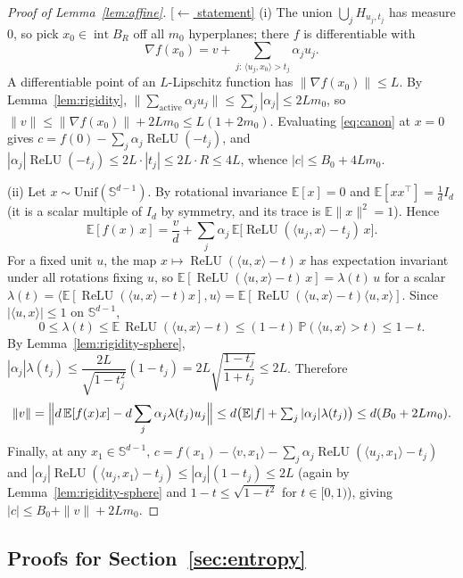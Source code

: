 \documentclass[11pt,reqno]{amsart}
\theoremstyle{plain}
\theoremstyle{definition}
\theoremstyle{remark}
\newcommand{\Sd}{\mathbb{S}^{d-1}}
\newcommand{\PP}{\mathbb{P}}
\newcommand{\EE}{\mathbb{E}}
\newcommand{\relu}{\operatorname{ReLU}}
\newcommand{\inn}[2]{\langle #1,#2\rangle}
\newcommand{\stmtbutton}[1]{\hyperref[#1]{\textnormal{\footnotesize\textsf{[$\leftarrow$ statement]}}}}
\begin{document}
\begin{proof}[Proof of Lemma~\textup{\ref{lem:affine}}]\label{proof:affine}\stmtbutton{lem:affine}
(i) The union $\bigcup_j H_{u_j,t_j}$ has measure $0$, so pick $x_0\in\operatorname{int}B_R$ off all $m_0$ hyperplanes; there $f$ is differentiable with
\[
\nabla f(x_0)=v+\sum_{j:\,\inn{u_j}{x_0}>t_j}\alpha_ju_j.
\]
A differentiable point of an $L$-Lipschitz function has $\|\nabla f(x_0)\|\le L$. By Lemma~\ref{lem:rigidity}, $\|\sum_{\text{active}}\alpha_ju_j\|\le\sum_j|\alpha_j|\le2Lm_0$, so $\|v\|\le\|\nabla f(x_0)\|+2Lm_0\le L(1+2m_0)$. Evaluating \eqref{eq:canon} at $x=0$ gives $c=f(0)-\sum_j\alpha_j\relu(-t_j)$, and $|\alpha_j|\relu(-t_j)\le2L\cdot|t_j|\le2L\cdot R\le4L$, whence $|c|\le B_0+4Lm_0$.

(ii) Let $x\sim\mathrm{Unif}(\Sd)$. By rotational invariance $\EE[x]=0$ and $\EE[xx^\top]=\tfrac1d I_d$ (it is a scalar multiple of $I_d$ by symmetry, and its trace is $\EE\|x\|^2=1$). Hence
\[
\EE[f(x)\,x]=\frac vd+\sum_j\alpha_j\,\EE\!\bigl[\relu(\inn{u_j}{x}-t_j)\,x\bigr].
\]
For a fixed unit $u$, the map $x\mapsto\relu(\inn{u}{x}-t)\,x$ has expectation invariant under all rotations fixing $u$, so $\EE[\relu(\inn{u}{x}-t)\,x]=\lambda(t)\,u$ for a scalar $\lambda(t)=\inn{\EE[\relu(\inn{u}{x}-t)x]}{u}=\EE[\relu(\inn{u}{x}-t)\inn{u}{x}]$. Since $|\inn{u}{x}|\le1$ on $\Sd$,
\[
0\le\lambda(t)\le\EE\,\relu(\inn{u}{x}-t)\le(1-t)\,\PP(\inn{u}{x}>t)\le1-t.
\]
By Lemma~\ref{lem:rigidity-sphere}, $|\alpha_j|\lambda(t_j)\le\dfrac{2L}{\sqrt{1-t_j^2}}(1-t_j)=2L\sqrt{\dfrac{1-t_j}{1+t_j}}\le2L$. Therefore
\[
\|v\|=\Bigl\|d\,\EE[f(x)x]-d\sum_j\alpha_j\lambda(t_j)u_j\Bigr\|\le d\bigl(\EE|f|+\textstyle\sum_j|\alpha_j|\lambda(t_j)\bigr)\le d(B_0+2Lm_0).
\]
Finally, at any $x_1\in\Sd$, $c=f(x_1)-\inn{v}{x_1}-\sum_j\alpha_j\relu(\inn{u_j}{x_1}-t_j)$ and $|\alpha_j|\relu(\inn{u_j}{x_1}-t_j)\le|\alpha_j|(1-t_j)\le2L$ (again by Lemma~\ref{lem:rigidity-sphere} and $1-t\le\sqrt{1-t^2}$ for $t\in[0,1)$), giving $|c|\le B_0+\|v\|+2Lm_0$.
\end{proof}

\subsection{Proofs for Section~\ref{sec:entropy}}
\end{document}
